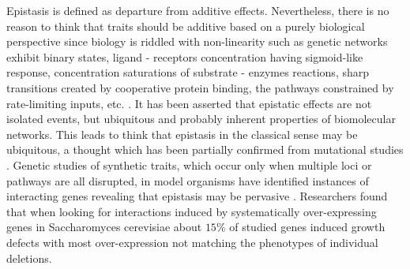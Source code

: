 Epistasis is defined as departure from additive effects.
Nevertheless, there is no reason to think that traits should be additive based on a purely biological perspective \cite{zuk2012mystery} since biology is riddled with non-linearity such as genetic networks exhibit binary states, ligand - receptors concentration having sigmoid-like response, concentration saturations of substrate - enzymes reactions, sharp transitions created by cooperative protein binding, the pathways constrained by rate-limiting inputs, etc. \cite{zuk2012mystery}. 
It has been asserted that epistatic effects are not isolated events, but ubiquitous \cite{tyler2009shadows} and probably inherent properties of biomolecular networks.
This leads to think that epistasis in the classical sense may be ubiquitous, a thought which has been partially confirmed from mutational studies \cite{phillips2008epistasis}.
Genetic studies of synthetic traits, which occur only when multiple loci or pathways are all disrupted, in model organisms have identified instances of interacting genes revealing that epistasis may be pervasive \cite{zuk2012mystery}. 
Researchers found \cite{phillips2008epistasis} that when looking for interactions induced by systematically over-expressing genes in Saccharomyces cerevisiae about $15\%$ of studied genes induced growth defects with most over-expression not matching the phenotypes of individual deletions.  


